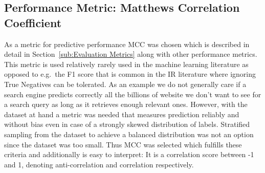 
\subsection{Performance Metric: Matthews Correlation Coefficient}
\label{sub:Performance Metric: Matthews Correlation Coefficient}

As a metric for predictive performance \gls{MCC} was chosen which is described in detail in Section~\ref{sub:Evaluation Metrics} along with other performance metrics. This metric is used relatively rarely used in the machine learning literature as opposed to e.g.\ the F1 score that is common in the \gls{IR} literature where ignoring True Negatives can be tolerated. As an example we do not generally care if a search engine predicts correctly all the billions of website we don't want to see for a search query as long as it retrieves enough relevant ones.
However, with the dataset at hand a metric was needed that measures prediction reliably and without bias even in case of a strongly skewed distribution of labels. Stratified sampling from the dataset to achieve a balanced distribution was not an option since the dataset was too small. Thus \gls{MCC} was selected which fulfills these criteria and additionally is easy to interpret: It is a correlation score between -1 and 1, denoting anti-correlation and correlation respectively.
